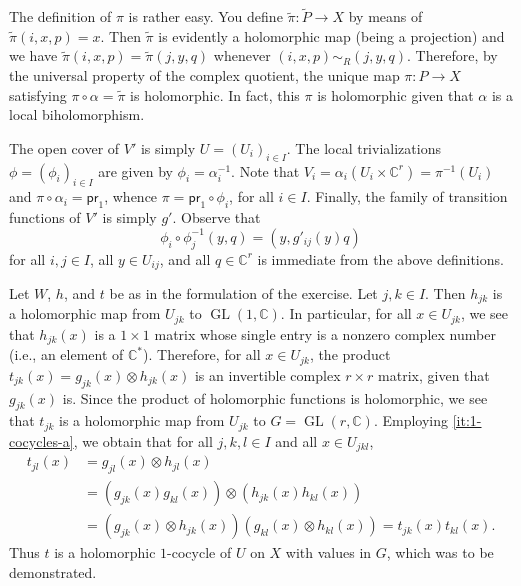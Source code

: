 \documentclass[a4paper]{amsart}
\newcommand{\C}{\mathbb{C}}
\newcommand{\pr}[1]{\mathsf{pr}_{#1}}
\theoremstyle{remark}
\numberwithin{equation}{question}
\DeclareMathOperator{\GL}{GL}
\begin{document}
\begin{solution}
\begin{solenum}
The definition of $\pi$ is rather easy. You define $\tilde\pi \colon \tilde P \to X$ by means of $\tilde\pi(i,x,p) = x$. Then $\tilde\pi$ is evidently a holomorphic map (being a projection) and we have $\tilde\pi(i,x,p) = \tilde\pi(j,y,q)$ whenever $(i,x,p) \sim_R (j,y,q)$. Therefore, by the universal property of the complex quotient, the unique map $\pi \colon P \to X$ satisfying $\pi \circ \alpha = \tilde\pi$ is holomorphic. In fact, this $\pi$ is holomorphic given that $\alpha$ is a local biholomorphism.

The open cover of $V'$ is simply $U = (U_i)_{i \in I}$. The local trivializations $\phi = (\phi_i)_{i \in I}$ are given by $\phi_i = \alpha_i^{-1}$. Note that $V_i = \alpha_i(U_i \times \C^r) = \pi^{-1}(U_i)$ and $\pi \circ \alpha_i = \pr1$, whence $\pi = \pr1 \circ \phi_i$, for all $i \in I$. Finally, the family of transition functions of $V'$ is simply $g'$. Observe that
\[
\phi_i \circ \phi_j^{-1}(y,q) = (y,g'_{ij}(y)q)
\]
for all $i,j \in I$, all $y \in U_{ij}$, and all $q \in \C^r$ is immediate from the above definitions.

\item Let $W$, $h$, and $t$ be as in the formulation of the exercise. Let $j,k \in I$. Then $h_{jk}$ is a holomorphic map from $U_{jk}$ to $\GL(1,\C)$. In particular, for all $x \in U_{jk}$, we see that $h_{jk}(x)$ is a $1\times1$ matrix whose single entry is a nonzero complex number (i.e., an element of $\C^*$). Therefore, for all $x \in U_{jk}$, the product $t_{jk}(x) = g_{jk}(x) \otimes h_{jk}(x)$ is an invertible complex $r\times r$ matrix, given that $g_{jk}(x)$ is. Since the product of holomorphic functions is holomorphic, we see that $t_{jk}$ is a holomorphic map from $U_{jk}$ to $G = \GL(r,\C)$.
Employing \cref{it:1-cocycles-a}, we obtain that for all $j,k,l \in I$ and all $x \in U_{jkl}$,
\begin{align*}
t_{jl}(x) &= g_{jl}(x) \otimes h_{jl}(x) \\
&= (g_{jk}(x)g_{kl}(x)) \otimes (h_{jk}(x)h_{kl}(x)) \\
&= (g_{jk}(x) \otimes h_{jk}(x))(g_{kl}(x) \otimes h_{kl}(x)) = t_{jk}(x) t_{kl}(x).
\end{align*}
Thus $t$ is a holomorphic $1$-cocycle of $U$ on $X$ with values in $G$, which was to be demonstrated.
\end{solenum}
\end{solution}
\end{document}
